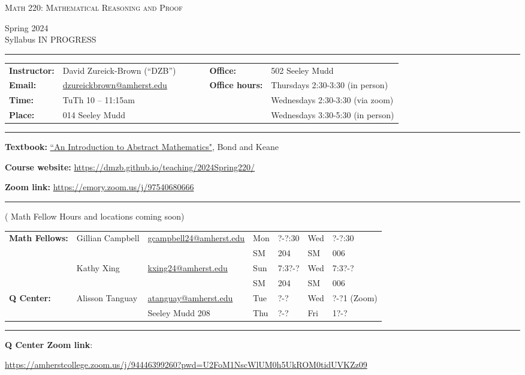 \documentclass[12pt]{article}
\begin{document}
\begin{center}
{\Large \textsc{Math 220: Mathematical Reasoning and Proof}}
\end{center}
\begin{center}
  Spring 2024
  \\
  {\color{red}Syllabus IN PROGRESS}  
\end{center}

\hrule \smallskip

\noindent \begin{tabular}{@{}llcccll}
\textbf{Instructor:} & David Zureick-Brown (``DZB'') & & & & \textbf{Office:} & 502 Seeley Mudd \\
 \textbf{Email:} & \href{mailto: dzureickbrown@amherst.edu}{dzureickbrown@amherst.edu} & & & & \textbf{Office hours:} & Thursdays 2:30-3:30 (in person)\\
 \textbf{Time:} & TuTh 10 -- 11:15am & & & & &Wednesdays 2:30-3:30 (via zoom) \\
 \textbf{Place:} & 014 Seeley Mudd & & & & & Wednesdays 3:30-5:30 (in person)
\end{tabular}



\smallskip \hrule \medskip

\noindent\textbf{Textbook:} 
\href{https://www.amazon.com/Introduction-Abstract-Mathematics-Robert-Bond/dp/1577665392}{``An Introduction to Abstract Mathematics"}, Bond and Keane

\noindent\textbf{Course website:} \url{https://dmzb.github.io/teaching/2024Spring220/}
\medskip

\noindent\textbf{Zoom link:} \url{https://emory.zoom.us/j/97540680666}

\smallskip \hrule \medskip

\begin{center}
\noindent ({\color{red} Math Fellow Hours and locations coming soon})
\end{center}
\smallskip

\noindent \begin{tabular}{@{}lllllll}
\textbf{Math Fellows:} & Gillian Campbell & \href{mailto: gcampbell24@amherst.edu}{gcampbell24@amherst.edu} 
   & Mon &?-?:30 & Wed & ?-?:30 \\
 & &   & SM & 204 & SM & 006\\ 
                       & Kathy Xing & \href{mailto: kxing24@amherst.edu}{kxing24@amherst.edu} 
   & Sun & 7:3?-? & Wed & 7:3?-? \\
 & &   & SM & 204 & SM & 006\\ 

\textbf{Q Center:}& Alisson Tanguay & \href{mailto: atanguay@amherst.edu}{atanguay@amherst.edu}  
  &Tue &?-? & Wed &?-?1 (Zoom) \\
 &&Seeley Mudd 208&Thu&?-?&Fri&1?-?
\end{tabular}
\smallskip \hrule \medskip          
\noindent\textbf{Q Center Zoom link}:
\begin{center}
  \url{https://amherstcollege.zoom.us/j/94446399260?pwd=U2FoM1NscWlUM0h5UkROM0tidUVKZz09}
\end{center}
\end{document}
